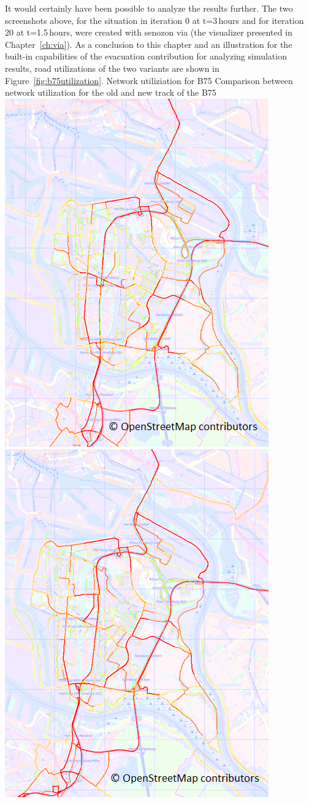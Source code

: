 It would certainly have been possible to analyze the results further. The two screenshots above, for the situation in iteration 0 at t=3\,hours and for iteration 20 at t=1.5\,hours, were created with \gls{senozon} \gls{via} (the visualizer presented in Chapter~\ref{ch:via}). As a conclusion to this chapter and an illustration for the built-in capabilities of the evacuation \gls{contribution} for analyzing simulation results, road utilizations of the two variants are shown in Figure~\ref{fig:b75utilization}.
%
\createfigure%
{Network utiliziation for B75}%
{Comparison between network utilization for the old and new track of the B75}%
{\label{fig:b75utilization}}%
{%
  \createsubfigure%
  {}%
  {\includegraphics[width=.475\linewidth]{scenarios/figures/b75utilizationold}}%
  {}%
  {}%
  \createsubfigure%
  {}%
  {\includegraphics[width=.475\linewidth]{scenarios/figures/b75utilizationnew}}
  {}%
  {}%
}%
  {}%
